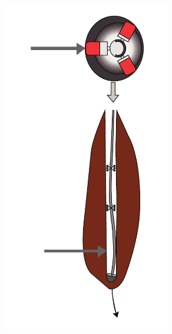 \documentclass[10pt]{beamer}
\begin{document}
\begin{frame}
\begin{columns}
\begin{column}{0.4\textwidth}
\begin{figure}[ht]
\begin{minipage}[t]{1\textwidth}
				\hspace{0cm}	\includegraphics[width=0.65\textwidth]{images/RSS.pdf}
				\end{minipage}
			\end{figure}			
		\end{column}
	\end{columns}
\end{frame}
\end{document}
